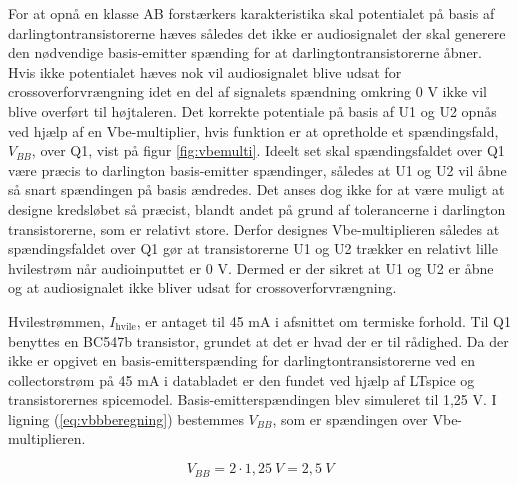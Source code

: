 For at opnå en klasse AB forstærkers karakteristika skal potentialet på basis af darlingtontransistorerne hæves således det ikke er audiosignalet der skal generere den nødvendige basis-emitter spænding for at darlingtontransistorerne åbner. Hvis ikke potentialet hæves nok vil audiosignalet blive udsat for crossoverforvrængning idet en del af signalets spændning omkring 0 V ikke vil blive overført til højtaleren. Det korrekte potentiale på basis af U1 og U2 opnås ved hjælp af en Vbe-multiplier, hvis funktion er at opretholde et spændingsfald, $V_{BB}$, over Q1, vist på figur \ref{fig:vbemulti}. Ideelt set skal spændingsfaldet over Q1 være præcis to darlington basis-emitter spændinger, således at U1 og U2 vil åbne så snart spændingen på basis ændredes. Det anses dog ikke for at være muligt at designe kredsløbet så præcist, blandt andet på grund af tolerancerne i darlington transistorerne, som er relativt store. Derfor designes Vbe-multiplieren således at spændingsfaldet over Q1 gør at transistorerne U1 og U2 trækker en relativt lille hvilestrøm når audioinputtet er 0 V. Dermed er der sikret at U1 og U2 er åbne og at audiosignalet ikke bliver udsat for crossoverforvrængning. 


Hvilestrømmen, $I_{\mathrm{hvile}}$, er antaget til 45 mA i afsnittet om termiske forhold. Til Q1 benyttes en BC547b transistor, grundet at det er hvad der er til rådighed. Da der ikke er opgivet en basis-emitterspænding for darlingtontransistorerne ved en collectorstrøm på 45 mA i databladet \cite{bdx33-34-datablad} er den fundet ved hjælp af LTspice og transistorernes spicemodel. Basis-emitterspændingen blev simuleret til 1,25 V. I ligning (\ref{eq:vbbberegning}) bestemmes $V_{BB}$, som er spændingen over Vbe-multiplieren.

\begin{equation}
V_{BB} =2 \cdot 1,25~V = 2,5~V
\label{eq:vbbberegning}
\end{equation}

